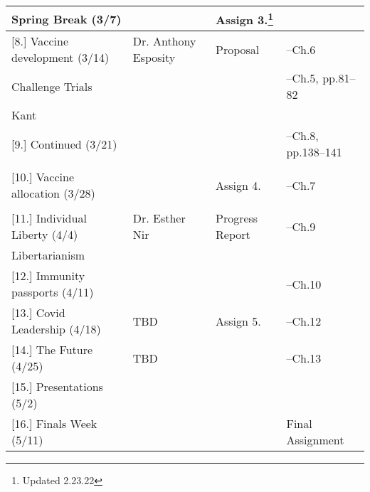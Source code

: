 \documentclass[article,oneside]{memoir}
\begin{document}
\begin{landscape}
\begin{center}
\begin{longtable}{p{6cm}p{4cm}p{6cm}p{4cm}}
\textbf{Spring Break} (3/7) & &Assign 3.\footnote{Updated 2.23.22} & \\ [1.8\baselineskip]  \hline

 							

[8.] Vaccine development (3/14)	& Dr. Anthony Esposity		& Proposal				& --Ch.6 \\ 
Challenge Trials				& 	 		&						& --Ch.5, pp.81--82  \\ 
Kant							&			&						&    	\\ [1.8\baselineskip] \hline		

[9.] Continued	(3/21)			& 			& 						&  --Ch.8, pp.138--141\\ 
							&			&						&    	\\ [1.8\baselineskip] \hline	 

[10.] Vaccine allocation (3/28)		& 			& Assign 4.				& --Ch.7  \\
	    						&			&      						&  \\  [1.8\baselineskip] \hline


[11.] Individual Liberty (4/4)		&	Dr. Esther Nir	& Progress Report			& --Ch.9  \\ 
Libertarianism					 &			&						& 	 \\ [1.8\baselineskip] \hline				


[12.] Immunity passports  (4/11) 	& 			&  			    			 & --Ch.10 \\ [1.8\baselineskip] \hline

[13.] Covid Leadership  (4/18) 		& TBD		&  Assign 5.    		  		 & --Ch.12   \\ [1.8\baselineskip] \hline


[14.] The Future  (4/25) 			& TBD		& 		     				 & --Ch.13   \\ [1.8\baselineskip] \hline


[15.] Presentations	(5/2)			& 			&						&  \\ [1.8\baselineskip] \hline

[16.] Finals Week (5/11)			&			&						 & Final Assignment \\ [1.8\baselineskip] \hline
	

\end{longtable}
\end{center}
\end{landscape}
\end{document}
